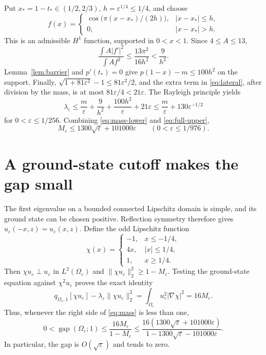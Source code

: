 \documentclass[11pt,a4paper]{article}
\theoremstyle{remark}
\newcommand{\eps}{\varepsilon}
\newcommand{\gap}{\operatorname{gap}}
\begin{document}
Put $x_*=1-t_*\in(1/2,2/3)$, $h=\eps^{1/4}\le1/4$, and choose
\[
 f(x)=\begin{cases}
 \cos\bigl(\pi(x-x_*)/(2h)\bigr),&|x-x_*|\le h,\\
 0,&|x-x_*|>h.
 \end{cases}
\]
This is an admissible $H^1$ function, supported in $0<x<1$. Since $4\le A\le13$,
\[
 \frac{\int A|f'|^2}{\int Af^2}\le\frac{13\pi^2}{16h^2}<\frac9{h^2}.
\]
Lemma~\ref{lem:barrier} and $p'(t_*)=0$ give $p(1-x)-m\le100h^2$ on the support. Finally,
$\sqrt{1+81\eps^2}-1\le81\eps^2/2$, and the extra term in \eqref{eq:lateral}, after division by the mass, is at most $81\eps/4<21\eps$. The Rayleigh principle yields
\begin{equation}\label{eq:full-upper}
 \lambda_\eps\le\frac m\eps+\frac9{h^2}+\frac{100h^2}\eps+21\eps
 \le\frac m\eps+130\eps^{-1/2}
\end{equation}
for $0<\eps\le1/256$. Combining \eqref{eq:mass-lower} and \eqref{eq:full-upper},
\begin{equation}\label{eq:mass}
 M_\eps\le1300\sqrt\eps+101000\eps
 \qquad (0<\eps\le1/976).
\end{equation}

\section{A ground-state cutoff makes the gap small}
The first eigenvalue on a bounded connected Lipschitz domain is simple, and its ground state can be chosen positive. Reflection symmetry therefore gives $u_\eps(-x,z)=u_\eps(x,z)$. Define the odd Lipschitz function
\[
 \chi(x)=\begin{cases}-1,&x\le-1/4,\\4x,&|x|\le1/4,\\1,&x\ge1/4.\end{cases}
\]
Then $\chi u_\eps\perp u_\eps$ in $L^2(\Omega_\eps)$ and
$\|\chi u_\eps\|_2^2\ge1-M_\eps$. Testing the ground-state equation against $\chi^2u_\eps$ proves the exact identity
\begin{equation}\label{eq:ground-id}
 q_{\Omega_\eps,1}[\chi u_\eps]
 -\lambda_\eps\|\chi u_\eps\|_2^2
 =\int_{\Omega_\eps}u_\eps^2|\nabla\chi|^2=16M_\eps.
\end{equation}
Thus, whenever the right side of \eqref{eq:mass} is less than one,
\begin{equation}\label{eq:gap}
 0<\gap(\Omega_\eps;1)
 \le\frac{16M_\eps}{1-M_\eps}
 \le\frac{16(1300\sqrt\eps+101000\eps)}{1-1300\sqrt\eps-101000\eps}.
\end{equation}
In particular, the gap is $O(\sqrt\eps)$ and tends to zero.
\end{document}
